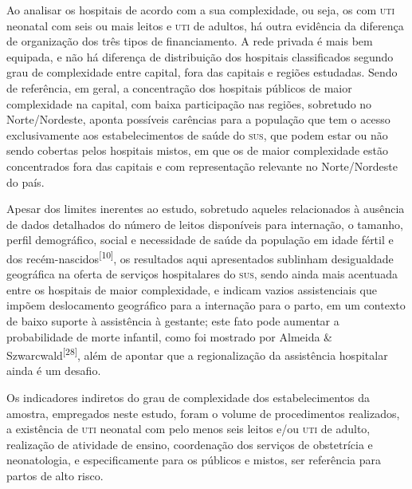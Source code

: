\documentclass{article}
\begin{document}
Ao analisar os hospitais de acordo com a sua complexidade, ou seja, os com \textsc{uti}
neonatal com seis ou mais leitos e \textsc{uti} de adultos, há outra evidência da
diferença
de organização dos três tipos de financiamento. A rede privada é mais bem
equipada,
e não há diferença de distribuição dos hospitais classificados segundo grau de
complexidade entre capital, fora das capitais e regiões estudadas. Sendo de
referência, em geral, a concentração dos hospitais públicos de maior
complexidade na
capital, com baixa participação nas regiões, sobretudo no Norte/Nordeste, aponta
possíveis carências para a população que tem o acesso exclusivamente aos
estabelecimentos de saúde do \textsc{sus}, que podem estar ou não sendo cobertas pelos
hospitais mistos, em que os de maior complexidade estão concentrados fora das
capitais e com representação relevante no Norte/Nordeste do país.

Apesar dos limites inerentes ao estudo, sobretudo aqueles relacionados à
ausência de
dados detalhados do número de leitos disponíveis para internação, o tamanho,
perfil
demográfico, social e necessidade de saúde da população em idade fértil e dos
recém-nascidos\textsuperscript{[}\textsuperscript{10}\textsuperscript{]}, os resultados
aqui apresentados sublinham desigualdade geográfica na oferta de serviços
hospitalares do \textsc{sus}, sendo ainda mais acentuada entre os hospitais de maior
complexidade, e indicam vazios assistenciais que impõem deslocamento geográfico
para
a internação para o parto, em um contexto de baixo suporte à assistência à
gestante;
este fato pode aumentar a probabilidade de morte infantil, como foi mostrado por
Almeida \& Szwarcwald\textsuperscript{[}\textsuperscript{28}\textsuperscript{]}, além
de apontar que a regionalização da assistência hospitalar ainda é um desafio.

Os indicadores indiretos do grau de complexidade dos estabelecimentos da
amostra,
empregados neste estudo, foram o volume de procedimentos realizados, a
existência de
\textsc{uti} neonatal com pelo menos seis leitos e/ou \textsc{uti} de adulto, realização de
atividade
de ensino, coordenação dos serviços de obstetrícia e neonatologia, e
especificamente
para os públicos e mistos, ser referência para partos de alto risco.
\end{document}

